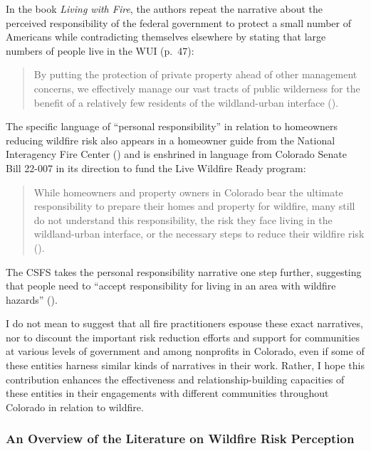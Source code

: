 \documentclass[
]{article}
\begin{document}
In the book \emph{Living with Fire}, the authors repeat the narrative about the perceived responsibility of the federal government to protect a small number of Americans while contradicting themselves elsewhere by stating that large numbers of people live in the WUI (p.~47):

\begin{quote}
By putting the protection of private property ahead of other management concerns, we effectively manage our vast tracts of public wilderness for the benefit of a relatively few residents of the wildland-urban interface ().
\end{quote}

The specific language of ``personal responsibility'' in relation to homeowners reducing wildfire risk also appears in a homeowner guide from the National Interagency Fire Center () and is enshrined in language from Colorado Senate Bill 22-007 in its direction to fund the Live Wildfire Ready program:

\begin{quote}
While homeowners and property owners in Colorado bear the ultimate responsibility to prepare their homes and property for wildfire, many still do not understand this responsibility, the risk they face living in the wildland-urban interface, or the necessary steps to reduce their wildfire risk ().
\end{quote}

The CSFS takes the personal responsibility narrative one step further, suggesting that people need to ``accept responsibility for living in an area with wildfire hazards'' ().

I do not mean to suggest that all fire practitioners espouse these exact narratives, nor to discount the important risk reduction efforts and support for communities at various levels of government and among nonprofits in Colorado, even if some of these entities harness similar kinds of narratives in their work. Rather, I hope this contribution enhances the effectiveness and relationship-building capacities of these entities in their engagements with different communities throughout Colorado in relation to wildfire.

\subsubsection{An Overview of the Literature on Wildfire Risk Perception}\label{an-overview-of-the-literature-on-wildfire-risk-perception}
\end{document}
